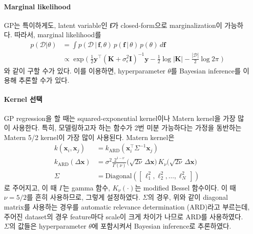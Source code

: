 \documentclass[ba, 11pt]{imsart}
\newcommand{\vf}{\mathbf{f}}
\newcommand{\vx}{\mathbf{x}}
\newcommand{\vy}{\mathbf{y}}
\newcommand{\mI}{\mathbf{I}}
\newcommand{\mK}{\mathbf{K}}
\begin{document}
\paragraph{Marginal likelihood}
GP는 특이하게도, latent variable인 \(\vf\)가 closed-form으로 marginalization이 가능하다.
따라서, marginal likelihood를
\begin{align}
  p(\mathcal{D} | \theta) &= \int p(\mathcal{D} \,|\, \vf, \theta) \, p(\vf \,|\, \theta) \, p(\theta) \, d\vf \\
  &\propto \exp\Big(\;  \frac{1}{2} \vy^{\top} {(\mK + \sigma^2_{\epsilon} \mI)}^{-1} \vy - \frac{1}{2} \log{|\mathbf{K}|} - \frac{|\mathcal{D}|}{2} \log{2 \pi} \;\Big)
\end{align}
와 같이 구할 수가 있다.
이를 이용하면, hyperparameter \(\theta\)를 Bayesian inference를 이용해 추론할 수가 있다.

\paragraph{Kernel 선택}
GP regression을 할 때는 squared-exponential kernel이나 Matern kernel을 가장 많이 사용한다.
특히, 모델링하고자 하는 함수가 2번 미분 가능하다는 가정을 동반하는 Matern 5/2 kernel이 가장 많이 사용된다.
Matern kernel은
\begin{align}
  k(\vx_i, \vx_j) &= k_{\text{ARD}}( \vx_i^{\top} \Sigma^{-1}  \vx_j )\\
  k_{\text{ARD}}(\Delta \vx)  &= \sigma^2 \frac{2^{1 - \nu}}{\Gamma(\nu)} \big( \sqrt{2 \nu} \, \Delta\vx \big) \, K_\nu \big( \sqrt{2 \nu} \, \Delta \vx \big) \\
  \Sigma &= \text{Diagonal}([\, \ell_1^2, \ell_2^2, \ldots, \ell_N^2 \,])
\end{align}
로 주어지고, 이 때 \(\Gamma\)는 gamma 함수, \(K_\nu(\cdot)\)는 modified Bessel 함수이다.
이 때 \(\nu = 5/2\)를 흔히 사용하므로, 그렇게 설정하였다.
\(\Sigma\)의 경우, 위와 같이 diagonal matrix를 사용하는 경우를 automatic relevance determination (ARD)라고 부르는데, 주어진 dataset의 경우 feature마다 scale이 크게 차이가 나므로 ARD를 사용하였다.
\(\Sigma\)의 값들은 hyperparameter \(\theta\)에 포함시켜서 Bayesian inference로 추론하였다.
\end{document}
